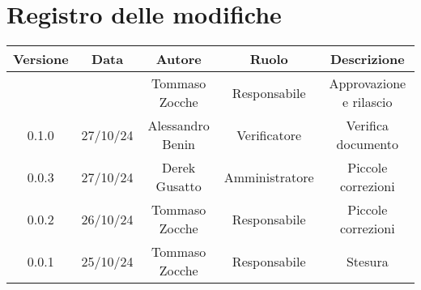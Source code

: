 
\section*{Registro delle modifiche}
\begin{table}[H]
    \begin{tabular}{|c|c|c|c|c|}
        \hline
         \textbf{Versione} &  \textbf{Data} &  \textbf{Autore} &  \textbf{Ruolo} & \textbf{Descrizione} \\
          \hline
          &  & Tommaso Zocche & Responsabile & Approvazione e rilascio\\
          \hline
           0.1.0 & 27/10/24 & Alessandro Benin & Verificatore &   Verifica documento\\
          \hline
          0.0.3 & 27/10/24 & Derek Gusatto & Amministratore & Piccole correzioni \\
          \hline
          0.0.2 & 26/10/24 & Tommaso Zocche & Responsabile & Piccole correzioni \\
          \hline
          0.0.1 & 25/10/24 & Tommaso Zocche & Responsabile & Stesura \\
          \hline
    \end{tabular}
\end{table}